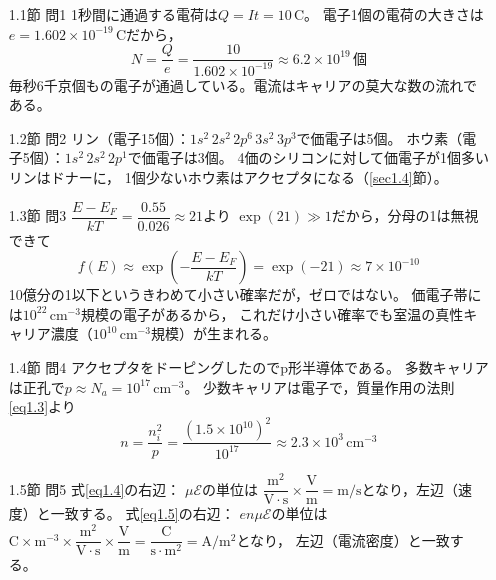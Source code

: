 \answer
\begin{enumerate}

\item[1.1節 問1]
1秒間に通過する電荷は$Q = It = 10\,\mathrm{C}$。
電子1個の電荷の大きさは$e = 1.602\times10^{-19}$\,Cだから，
\begin{equation*}
N = \frac{Q}{e} = \frac{10}{1.602\times10^{-19}} \approx 6.2\times10^{19}\,\text{個}
\end{equation*}
毎秒6千京個もの電子が通過している。電流はキャリアの莫大な数の流れである。

\item[1.2節 問2]
リン（電子15個）：$1s^2\,2s^2\,2p^6\,3s^2\,3p^3$で価電子は5個。
ホウ素（電子5個）：$1s^2\,2s^2\,2p^1$で価電子は3個。
4価のシリコンに対して価電子が1個多いリンはドナーに，
1個少ないホウ素はアクセプタになる（\ref{sec1.4}節）。

\item[1.3節 問3]
$\dfrac{E-E_F}{kT} = \dfrac{0.55}{0.026} \approx 21$より
$\exp(21) \gg 1$だから，分母の1は無視できて
\begin{equation*}
f(E) \approx \exp\left(-\frac{E-E_F}{kT}\right) = \exp(-21) \approx 7\times10^{-10}
\end{equation*}
10億分の1以下というきわめて小さい確率だが，ゼロではない。
価電子帯には$10^{22}\,\mathrm{cm^{-3}}$規模の電子があるから，
これだけ小さい確率でも室温の真性キャリア濃度（$10^{10}\,\mathrm{cm^{-3}}$規模）が生まれる。

\item[1.4節 問4]
アクセプタをドーピングしたのでp形半導体である。
多数キャリアは正孔で$p \approx N_a = 10^{17}\,\mathrm{cm^{-3}}$。
少数キャリアは電子で，質量作用の法則\ref{eq1.3}より
\begin{equation*}
n = \frac{n_i^2}{p} = \frac{(1.5\times10^{10})^2}{10^{17}}
\approx 2.3\times10^{3}\,\mathrm{cm^{-3}}
\end{equation*}

\item[1.5節 問5]
式\ref{eq1.4}の右辺：
$\mu\mathcal{E}$の単位は
$\dfrac{\mathrm{m^2}}{\mathrm{V\cdot s}}\times\dfrac{\mathrm{V}}{\mathrm{m}}
= \mathrm{m/s}$となり，左辺（速度）と一致する。
式\ref{eq1.5}の右辺：
$en\mu\mathcal{E}$の単位は
$\mathrm{C}\times\mathrm{m^{-3}}\times\dfrac{\mathrm{m^2}}{\mathrm{V\cdot s}}\times\dfrac{\mathrm{V}}{\mathrm{m}}
= \dfrac{\mathrm{C}}{\mathrm{s\cdot m^2}} = \mathrm{A/m^2}$となり，
左辺（電流密度）と一致する。


\end{enumerate}
